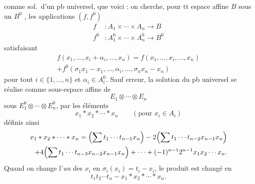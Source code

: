 \documentclass[11pt,a4paper]{article}
\begin{document}
comme sol.\ d'un pb universel, que voici : on cherche, pour tt espace affine $B$ sous un $B^0$ , les applications $(f, f^0)$
\[
  \begin{aligned}
    f &: A_1 \times \cdots \times A_n \longrightarrow B \\
    f^0 &: A_1^0 \times \cdots \times A_n^0 \longrightarrow B^0
  \end{aligned}
\]
satisfaisant
\[
  \begin{aligned}
    f(x_1, \ldots, x_i + \alpha_i, \ldots, x_n) = f(x_1, \ldots, x_i, \ldots, x_n) \\
    + f^0(\sigma_1 x_1 - x_1, \ldots, \alpha_i, \ldots, \sigma_n x_n - x_n)
  \end{aligned}
\]
pour tout $i \in \{1, \ldots, n\}$ et $\alpha_i \in A_i^0$. Sauf erreur, la solution du pb universel se réalise comme sous-espace affine de
\[
  E_1 \otimes \cdots \otimes E_n
\]
sous $E_1^0 \otimes \cdots \otimes E_n^0$, par les éléments
\[
  x_1 * x_2 * \cdots * x_n \qquad (\text{pour } x_i \in A_i)
\]
définis ainsi 
\[
  \begin{aligned}
    x_1 * x_2 * \cdots * x_n = \Bigl(\sum t_1 \cdots t_{n-1} x_n\Bigr) - 2\Bigl(\sum t_1 \cdots t_{n-2} x_{n-1} x_n\Bigr) \\
    + 4\Bigl(\sum t_1 \cdots t_{n-3} x_{n-2} x_{n-1} x_n\Bigr) + \cdots + (-1)^{n-1} 2^{n-1} x_1 x_2 \cdots x_n .
  \end{aligned}
\]
Quand on change l'\emph{un} des $x_i$ en $\sigma_i(x_i) = t_i - x_i$, le produit est changé en
\[
  t_1 t_2 \cdots t_n - x_1 * x_2 * \cdots * x_n .
\]

\end{document}
